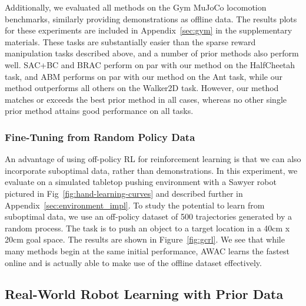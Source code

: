 Additionally, we evaluated all methods on the Gym MuJoCo locomotion benchmarks, similarly providing demonstrations as offline data. The results plots for these experiments are included in Appendix~\ref{sec:gym} in the supplementary materials. These tasks are substantially easier than the sparse reward manipulation tasks described above, and a number of prior methods also perform well. 
SAC+BC and BRAC perform on par with our method on the HalfCheetah task, and ABM performs on par with our method on the Ant task, while our method outperforms all others on the Walker2D task. 
However, our method matches or exceeds the best prior method in all cases, whereas no other single prior method attains good performance on all tasks.

\subsubsection{Fine-Tuning from Random Policy Data} \label{sec:random_exps}



An advantage of using off-policy RL for reinforcement learning is that we can also incorporate suboptimal data, rather than demonstrations. In this experiment, we evaluate on a simulated tabletop pushing environment with a Sawyer robot pictured in Fig~\ref{fig:hand-learning-curves} and described further in Appendix~\ref{sec:environment_impl}.
To study the potential to learn from suboptimal data, we use an off-policy dataset of 500 trajectories generated by a random process. 
The task is to push an object to a target location in a 40cm x 20cm goal space.
The results are shown in Figure~\ref{fig:gcrl}. We see that while many methods begin at the same initial performance, AWAC learns the fastest online and is actually able to make use of the offline dataset effectively.

\subsection{Real-World Robot Learning with Prior Data} \label{sec:real_world_exps}

